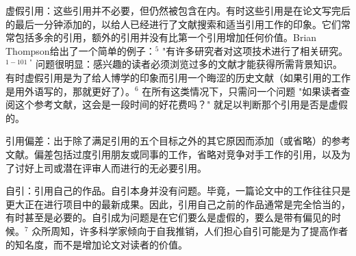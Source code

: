 虚假引用：这些引用并不必要，但仍然被包含在内。有时这些引用是在论文写完后的最后一分钟添加的，以给人已经进行了文献搜索和适当引用工作的印象。它们常常包括多余的引用，额外的引用并没有比第一个引用增加任何价值。Brian Thompson给出了一个简单的例子：${ }^{5}$ "有许多研究者对这项技术进行了相关研究。${ }^{1-101 \text{ "}}$ 问题很明显：感兴趣的读者必须浏览过多的文献才能获得所需背景知识。有时虚假引用是为了给人博学的印象而引用一个晦涩的历史文献（如果引用的工作是用外语写的，那就更好了）。$^{6}$ 在所有这类情况下，只需问一个问题 "如果读者查阅这个参考文献，这会是一段时间的好花费吗？" 就足以判断那个引用是否是虚假的。

引用偏差：出于除了满足引用的五个目标之外的其它原因而添加（或省略）的参考文献。偏差包括过度引用朋友或同事的工作，省略对竞争对手工作的引用，以及为了讨好上司或潜在评审人而进行的无必要引用。

自引：引用自己的作品。自引本身并没有问题。毕竟，一篇论文中的工作往往只是更大正在进行项目中的最新成果。因此，引用自己之前的作品通常是完全恰当的，有时甚至是必要的。自引成为问题是在它们要么是虚假的，要么是带有偏见的时候。${ }^{7}$ 众所周知，许多科学家倾向于自我推销，人们担心自引可能是为了提高作者的知名度，而不是增加论文对读者的价值。

